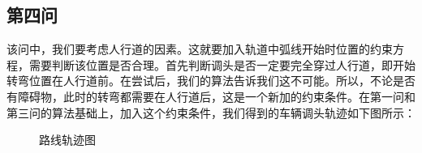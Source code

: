 \documentclass{article}
\begin{document}
	\subsection{第四问}
	该问中，我们要考虑人行道的因素。这就要加入轨道中弧线开始时位置的约束方程，需要判断该位置是否合理。首先判断调头是否一定要完全穿过人行道，即开始转弯位置在人行道前。在尝试后，我们的算法告诉我们这不可能。所以，不论是否有障碍物，此时的转弯都需要在人行道后，这是一个新加的约束条件。在第一问和第三问的算法基础上，加入这个约束条件，我们得到的车辆调头轨迹如下图所示：
	\begin{figure}[!h]
		\centering 
		\caption{路线轨迹图}
	\end{figure}
\end{document}

